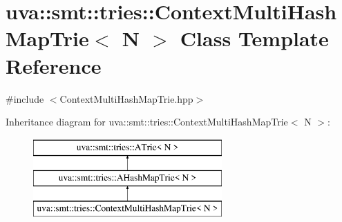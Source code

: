 \hypertarget{classuva_1_1smt_1_1tries_1_1_context_multi_hash_map_trie}{}\section{uva\+:\+:smt\+:\+:tries\+:\+:Context\+Multi\+Hash\+Map\+Trie$<$ N $>$ Class Template Reference}
\label{classuva_1_1smt_1_1tries_1_1_context_multi_hash_map_trie}


{\ttfamily \#include $<$Context\+Multi\+Hash\+Map\+Trie.\+hpp$>$}

Inheritance diagram for uva\+:\+:smt\+:\+:tries\+:\+:Context\+Multi\+Hash\+Map\+Trie$<$ N $>$\+:\begin{figure}[H]
\begin{center}
\leavevmode
\includegraphics[height=3.000000cm]{classuva_1_1smt_1_1tries_1_1_context_multi_hash_map_trie}
\end{center}
\end{figure}

